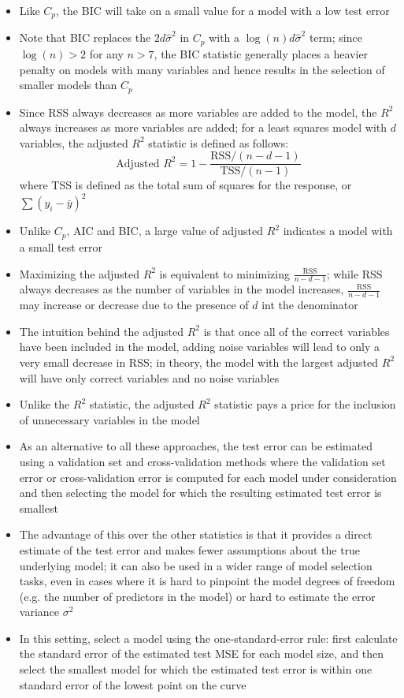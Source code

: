 \documentclass[12pt]{article}
\begin{document}
\begin{itemize}
\item Like $C_p$, the BIC will take on a small value for a model with a low test error
\item Note that BIC replaces the $2d\hat{\sigma}^2$ in $C_p$ with a $\log(n)d\hat{\sigma}^2$ term; since $\log(n) > 2$ for any $n>7$, the BIC statistic generally places a heavier penalty on models with many variables and hence results in the selection of smaller models than $C_p$ 
\item Since RSS always decreases as more variables are added to the model, the $R^2$ always increases as more variables are added; for a least squares model with $d$ variables, the adjusted $R^2$ statistic is defined as follows: $$\text{Adjusted } R^2 = 1 - \frac{\text{RSS}/(n-d-1)}{\text{TSS}/(n-1)}$$ where TSS is defined as the total sum of squares for the response, or $\sum (y_i - \bar{y})^2$ 
\item Unlike $C_p$, AIC and BIC, a large value of adjusted $R^2$ indicates a model with a small test error 
\item Maximizing the adjusted $R^2$ is equivalent to minimizing $\frac{\text{RSS}}{n-d-1}$; while RSS always decreases as the number of variables in the model increases, $\frac{\text{RSS}}{n-d-1}$ may increase or decrease due to the presence of $d$ int the denominator
\item The intuition behind the adjusted $R^2$ is that once all of the correct variables have been included in the model, adding noise variables will lead to only a very small decrease in RSS; in theory, the model with the largest adjusted $R^2$ will have only correct variables and no noise variables 
\item Unlike the $R^2$ statistic, the adjusted $R^2$ statistic pays a price for the inclusion of unnecessary variables in the model 
\item As an alternative to all these approaches, the test error can be estimated using a validation set and cross-validation methods where the validation set error or cross-validation error is computed for each model under consideration and then selecting the model for which the resulting estimated test error is smallest 
\item The advantage of this over the other statistics is that it provides a direct estimate of the test error and makes fewer assumptions about the true underlying model; it can also be used in a wider range of model selection tasks, even in cases where it is hard to pinpoint the model degrees of freedom (e.g. the number of predictors in the model) or hard to estimate the error variance $\sigma^2$ 
\item In this setting, select a model using the one-standard-error rule: first calculate the standard error of the estimated test MSE for each model size, and then select the smallest model for which the estimated test error is within one standard error of the lowest point on the curve 
\end{itemize}
\end{document}

